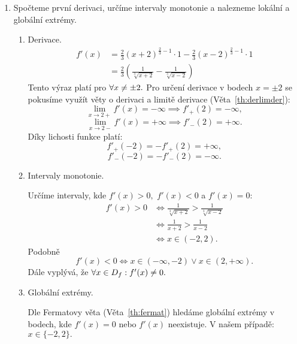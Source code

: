 \begin{example}
\begin{enumerate}
        \item Spočteme první derivaci, určíme intervaly monotonie a 
            nalezneme lokální a globální extrémy.
            
            \begin{enumerate}
                \item Derivace.
                    \begin{align*}
                        f'(x) 
                        &= \frac{2}{3}(x+2)^{\frac{2}{3}-1} \cdot 1 
                            - \frac{2}{3}(x-2)^{\frac{2}{3}-1}\cdot 1 \\
                        &= \frac{2}{3}\left(\frac{1}{\sqrt[3]{x+2}} - \frac{1}{\sqrt[3]{x-2}}\right)
                    \end{align*}
                    Tento výraz platí pro $\forall x \neq \pm2.$ Pro určení derivace v bodech
                    $x = \pm 2$ se pokusíme využít věty o derivaci a limitě derivace
                    (Věta~\ref{th:derlimder}):
                    $$\lim_{x \to 2+} f'(x) = -\infty \implies f'_+(2) = -\infty,$$
                    $$\lim_{x \to 2-} f'(x) = +\infty \implies f'_-(2) = +\infty.$$
                    Díky lichosti funkce platí:
                    $$f'_+(-2) = -f'_+(2) = +\infty,$$
                    $$f'_-(-2) = -f'_-(2) = -\infty.$$
                \item Intervaly monotonie.

                    Určíme intervaly, kde $f'(x) > 0,$ $f'(x) < 0$ a $f'(x) =0:$
                    \begin{align*}
                        f'(x) > 0 
                        &\iff \frac{1}{\sqrt[3]{x+2}} > \frac{1}{\sqrt[3]{x-2}} \\
                        &\iff \frac{1}{x+2} > \frac{1}{x-2} \\
                        &\iff x \in (-2,2).
                    \end{align*}
                    Podobně
                    $$f'(x) < 0 \iff x \in (-\infty,-2) \lor x \in (2,+\infty).$$
                    Dále vyplývá, že $\forall x \in D_f: f'(x) \neq 0.$

                \item Globální extrémy.
                    
                    Dle Fermatovy věta (Věta~\ref{th:fermat}) hledáme globální 
                    extrémy v bodech, kde $f'(x) = 0$ nebo $f'(x)$ neexistuje.
                    V našem případě: $x \in \{-2,2\}.$ 
                    

\end{enumerate}
\end{enumerate}
\end{example}
